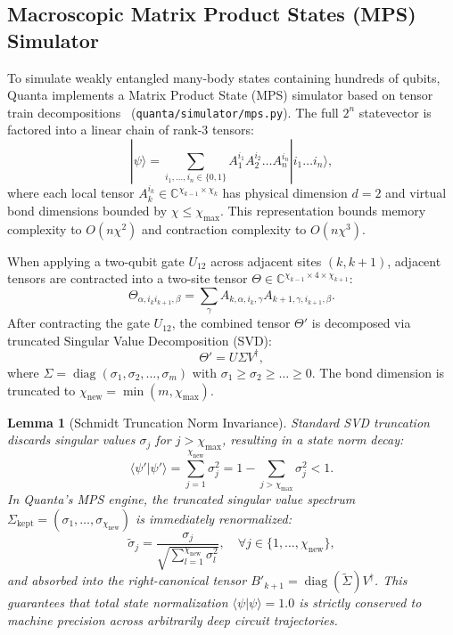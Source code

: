 \documentclass[aps,prx,twocolumn,superscriptaddress,nofootinbib]{revtex4-2}
\newcommand{\ket}[1]{|#1\rangle}
\newcommand{\braket}[2]{\langle#1|#2\rangle}
\newcommand{\diag}{\operatorname{diag}}
\newtheorem{lemma}[theorem]{Lemma}
\begin{document}
\subsection{Macroscopic Matrix Product States (MPS) Simulator}
\label{subsec:mps_core}

To simulate weakly entangled many-body states containing hundreds of qubits, Quanta implements a Matrix Product State (MPS) simulator based on tensor train decompositions~\cite{vidal2003efficient,schollwoeck2011density} (\texttt{quanta/simulator/mps.py}). The full $2^n$ statevector is factored into a linear chain of rank-3 tensors:
\begin{equation}
    \ket{\psi} = \sum_{i_1, \dots, i_n \in \{0, 1\}} A_1^{i_1} A_2^{i_2} \dots A_n^{i_n} \ket{i_1 \dots i_n},
\end{equation}
where each local tensor $A_k^{i_k} \in \mathbb{C}^{\chi_{k-1} \times \chi_k}$ has physical dimension $d=2$ and virtual bond dimensions bounded by $\chi \le \chi_{\text{max}}$. This representation bounds memory complexity to $O(n \chi^2)$ and contraction complexity to $O(n \chi^3)$.

When applying a two-qubit gate $U_{12}$ across adjacent sites $(k, k+1)$, adjacent tensors are contracted into a two-site tensor $\Theta \in \mathbb{C}^{\chi_{k-1} \times 4 \times \chi_{k+1}}$:
\begin{equation}
    \Theta_{\alpha, i_k i_{k+1}, \beta} = \sum_{\gamma} A_{k, \alpha, i_k, \gamma} A_{k+1, \gamma, i_{k+1}, \beta}.
\end{equation}
After contracting the gate $U_{12}$, the combined tensor $\Theta'$ is decomposed via truncated Singular Value Decomposition (SVD):
\begin{equation}
    \Theta' = U \Sigma V^\dagger,
\end{equation}
where $\Sigma = \diag(\sigma_1, \sigma_2, \dots, \sigma_m)$ with $\sigma_1 \ge \sigma_2 \ge \dots \ge 0$. The bond dimension is truncated to $\chi_{\text{new}} = \min(m, \chi_{\text{max}})$.

\begin{lemma}[Schmidt Truncation Norm Invariance]
Standard SVD truncation discards singular values $\sigma_j$ for $j > \chi_{\text{max}}$, resulting in a state norm decay:
\begin{equation}
    \braket{\psi'}{\psi'} = \sum_{j=1}^{\chi_{\text{new}}} \sigma_j^2 = 1 - \sum_{j > \chi_{\text{max}}} \sigma_j^2 < 1.
\end{equation}
In Quanta's MPS engine, the truncated singular value spectrum $\Sigma_{\text{kept}} = (\sigma_1, \dots, \sigma_{\chi_{\text{new}}})$ is immediately renormalized:
\begin{equation}
    \tilde{\sigma}_j = \frac{\sigma_j}{\sqrt{\sum_{l=1}^{\chi_{\text{new}}} \sigma_l^2}}, \quad \forall j \in \{1, \dots, \chi_{\text{new}}\},
\end{equation}
and absorbed into the right-canonical tensor $B'_{k+1} = \diag(\tilde{\Sigma}) V^\dagger$. This guarantees that total state normalization $\braket{\psi}{\psi} = 1.0$ is strictly conserved to machine precision across arbitrarily deep circuit trajectories.
\end{lemma}
\end{document}
